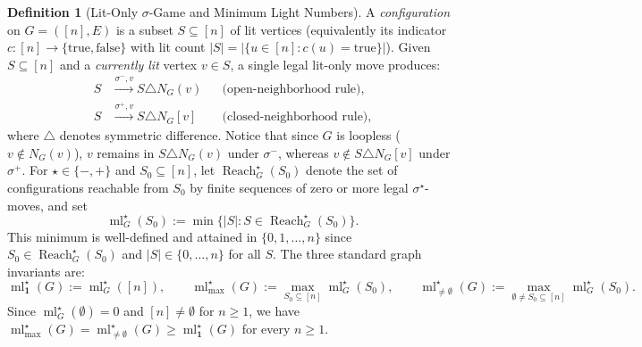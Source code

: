 \documentclass[11pt,a4paper]{article}
\theoremstyle{definition}
\newtheorem{definition}[theorem]{Definition}
\newcommand{\ml}{\operatorname{ml}}
\newcommand{\Reach}{\operatorname{Reach}}
\begin{document}
\begin{definition}[Lit-Only $\sigma$-Game and Minimum Light Numbers]
\label{def:minlit}
A \emph{configuration} on $G = ([n], E)$ is a subset $S \subseteq [n]$ of lit vertices
(equivalently its indicator $c : [n] \to \{\mathrm{true}, \mathrm{false}\}$ with lit
count $|S| = |\{u \in [n] : c(u) = \mathrm{true}\}|$). Given $S \subseteq [n]$ and
a \emph{currently lit} vertex $v \in S$, a single legal lit-only move produces:
\[
\begin{aligned}
S &\xrightarrow{\sigma^-, v} S \triangle N_G(v) &&\text{(open-neighborhood rule)}, \\
S &\xrightarrow{\sigma^+, v} S \triangle N_G[v] &&\text{(closed-neighborhood rule)},
\end{aligned}
\]
where $\triangle$ denotes symmetric difference. Notice that since $G$ is loopless
($v \notin N_G(v)$), $v$ remains in $S \triangle N_G(v)$ under $\sigma^-$, whereas
$v \notin S \triangle N_G[v]$ under $\sigma^+$. For $\star \in \{-, +\}$ and
$S_0 \subseteq [n]$, let $\Reach_G^\star(S_0)$ denote the set of configurations
reachable from $S_0$ by finite sequences of zero or more legal $\sigma^\star$-moves,
and set
\[
\ml_G^\star(S_0) := \min \{ |S| : S \in \Reach_G^\star(S_0) \}.
\]
This minimum is well-defined and attained in $\{0, 1, \dots, n\}$ since
$S_0 \in \Reach_G^\star(S_0)$ and $|S| \in \{0, \dots, n\}$ for all $S$. The three
standard graph invariants are:
\[
\ml_{\mathbf{1}}^\star(G) := \ml_G^\star([n]), \qquad
\ml_{\max}^\star(G) := \max_{S_0 \subseteq [n]} \ml_G^\star(S_0), \qquad
\ml_{\neq\emptyset}^\star(G) := \max_{\emptyset \neq S_0 \subseteq [n]} \ml_G^\star(S_0).
\]
Since $\ml_G^\star(\emptyset) = 0$ and $[n] \neq \emptyset$ for $n \ge 1$, we have
$\ml_{\max}^\star(G) = \ml_{\neq\emptyset}^\star(G) \ge \ml_{\mathbf{1}}^\star(G)$
for every $n \ge 1$.
\end{definition}
\end{document}
